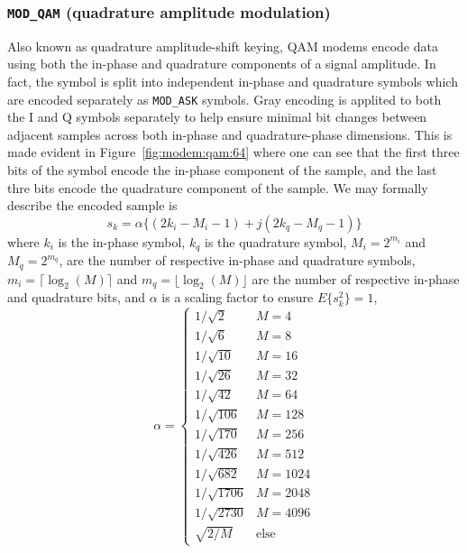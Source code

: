 \subsubsection{{\tt MOD\_QAM} (quadrature amplitude modulation)}
\label{module:modem:digital:QAM}
Also known as quadrature amplitude-shift keying, QAM modems encode data using
both the in-phase and quadrature components of a signal amplitude.
In fact, the symbol is split into independent in-phase and quadrature symbols
which are encoded separately as {\tt MOD\_ASK} symbols.
Gray encoding is applited to both the I and Q symbols separately to help
ensure minimal bit changes between adjacent samples across both in-phase and
quadrature-phase dimensions.
This is made evident in Figure~\ref{fig:modem:qam:64} where one can see that
the first three bits of the symbol encode the in-phase component of the
sample, and the last thre bits encode the quadrature component of the sample.
%
We may formally describe the encoded sample is
\[
    s_k = \alpha \{ ( 2 k_i - M_i - 1 ) + j(2 k_q - M_q - 1) \}
\]
where
$k_i$ is the in-phase symbol,
$k_q$ is the quadrature symbol,
$M_i = 2^{m_i}$ and $M_q = 2^{m_q}$, are the number of respective in-phase and
quadrature symbols,
$m_i=\lceil \log_2(M) \rceil$ and $m_q=\lfloor \log_2(M) \rfloor$ are the
number of respective in-phase and quadrature bits, and
$\alpha$ is a scaling factor to ensure $E\{s_k^2\}=1$,
\[
    \alpha = 
    \begin{cases}
    1/\sqrt{2}      &   M=4     \\
    1/\sqrt{6}      &   M=8     \\
    1/\sqrt{10}     &   M=16    \\
    1/\sqrt{26}     &   M=32    \\
    1/\sqrt{42}     &   M=64    \\
    1/\sqrt{106}    &   M=128   \\
    1/\sqrt{170}    &   M=256   \\
    1/\sqrt{426}    &   M=512   \\
    1/\sqrt{682}    &   M=1024  \\
    1/\sqrt{1706}   &   M=2048  \\
    1/\sqrt{2730}   &   M=4096  \\
    \sqrt{2/M}      &   \text{else}
    \end{cases}
\]


